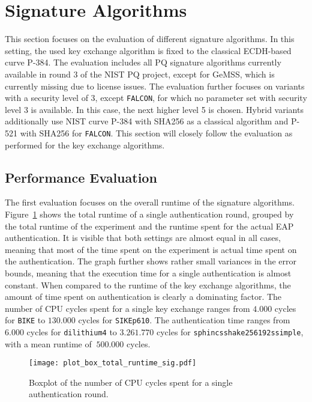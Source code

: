 \newpage
\section{Signature Algorithms}

This section focuses on the evaluation of different signature algorithms. In this setting, the used key exchange algorithm is fixed to the classical \ac{ECDH}-based curve P-384. The evaluation includes all PQ signature algorithms currently available in round 3 of the \ac{NIST} \ac{PQ} project, except for GeMSS, which is currently missing due to license issues. The evaluation further focuses on variants with a security level of 3, except \texttt{FALCON}, for which no parameter set with security level 3 is available. In this case, the next higher level 5 is chosen. Hybrid variants additionally use \ac{NIST} curve P-384 with SHA256 as a classical algorithm and P-521 with SHA256 for \texttt{FALCON}. This section will closely follow the evaluation as performed for the key exchange algorithms.

\subsection{Performance Evaluation}

The first evaluation focuses on the overall runtime of the signature algorithms. Figure~\ref{fig:plot_box_total_runtime_sig.pdf} shows the total runtime of a single authentication round, grouped by the total runtime of the experiment and the runtime spent for the actual \ac{EAP} authentication. It is visible that both settings are almost equal in all cases, meaning that most of the time spent on the experiment is actual time spent on the authentication. The graph further shows rather small variances in the error bounds, meaning that the execution time for a single authentication is almost constant. When compared to the runtime of the key exchange algorithms, the amount of time spent on authentication is clearly a dominating factor. The number of CPU cycles spent for a single key exchange ranges from \(4.000\) cycles for \texttt{BIKE} to \(130.000\) cycles for \texttt{SIKEp610}. The authentication time ranges from \(6.000\) cycles for \texttt{dilithium4} to \(3.261.770\) cycles for \texttt{sphincsshake256192ssimple}, with a mean runtime of \(~500.000\) cycles.

\begin{figure}[ht]
    \centering\texttt{[image: plot\_box\_total\_runtime\_sig.pdf]}
    \caption{Boxplot of the number of CPU cycles spent for a single authentication round.}\label{fig:plot_box_total_runtime_sig.pdf}
\end{figure}

